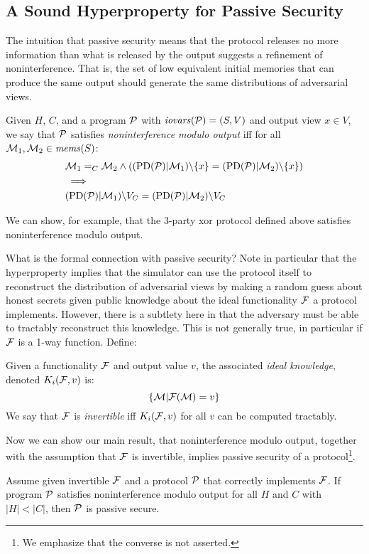 \subsection{A Sound Hyperproperty for Passive Security}
The intuition that passive security means that the protocol releases
no more information than what is released by the output suggests a
refinement of noninterference. That is, the set of low equivalent
initial memories that can produce the same output should generate the
same distributions of adversarial views.
\begin{definition}
  Given $H$, $C$, and a program $\mathcal{P}$ with $\mathit{iovars}(\mathcal{P}) = (S,V)$ and output
  view $x \in V$, we say that
  $\mathcal{P}$ satisfies \emph{noninterference modulo output} iff for all
  $\mathcal{M}_1,\mathcal{M}_2 \in \mathit{mems}(S)$:
  \begin{eqnarray*}
    & \mathcal{M}_1 =_C \mathcal{M}_2 \wedge
     ((\mathrm{PD}(\mathcal{P})|\mathcal{M}_1)\backslash\{ x \} =
     (\mathrm{PD}(\mathcal{P})|\mathcal{M}_2)\backslash\{ x \}) \\
    & \implies \\
    & (\mathrm{PD}(\mathcal{P})|\mathcal{M}_1)\backslash V_C =
    (\mathrm{PD}(\mathcal{P})|\mathcal{M}_2)\backslash V_C
  \end{eqnarray*}
\end{definition}
We can show, for example, that the 3-party xor protocol defined above
satisfies noninterference modulo output.

What is the formal connection with passive security? Note in
particular that the hyperproperty implies that the simulator can use
the protocol itself to reconstruct the distribution of adversarial
views by making a random guess about honest secrets given public
knowledge about the ideal functionality $\mathcal{F}$ a protocol
implements. However, there is a subtlety here in that the adversary
must be able to tractably reconstruct this knowledge. This is not
generally true, in particular if $\mathcal{F}$ is a 1-way
function. Define:
\begin{definition}
  Given a functionality $\mathcal{F}$ and output value $v$, the associated
  \emph{ideal knowledge}, denoted $K_i(\mathcal{F},v)$ is:
  $$
  \{ \mathcal{M} | \mathcal{F}(\mathcal{M}) = v \}
  $$
  We say that $\mathcal{F}$ is \emph{invertible} iff $K_i(\mathcal{F}, v)$ for all
  $v$ can be computed tractably.
\end{definition}
Now we can show our main result, that noninterference modulo output,
together with the assumption that $\mathcal{F}$ is invertible, implies
passive security of a protocol\footnote{We emphasize that the converse
is not asserted.}. 
\begin{theorem}
  Assume given invertible $\mathcal{F}$ and a protocol $\mathcal{P}$ that
  correctly implements $\mathcal{F}$.  If program $\mathcal{P}$ satisfies
  noninterference modulo output for all $H$ and $C$ with $|H| < |C|$,
  then $\mathcal{P}$ is passive secure.
\end{theorem}

